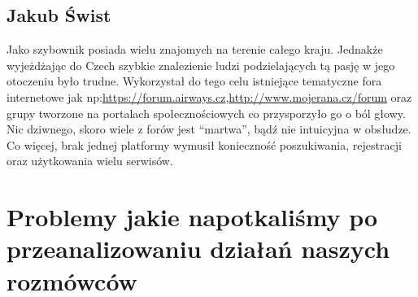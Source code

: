 \documentclass{article}
\begin{document}
\subsection{Jakub Świst}
Jako szybownik posiada wielu znajomych na terenie całego kraju. Jednakże wyjeżdżając do Czech szybkie znalezienie ludzi podzielających tą pasję w jego otoczeniu było trudne. Wykorzystał do tego celu istniejące tematyczne fora internetowe jak np:\url{https://forum.airways.cz},\url{http://www.mojerana.cz/forum} oraz grupy tworzone na portalach społecznościowych co przysporzyło go o ból głowy. Nic dziwnego, skoro wiele z forów jest “martwa”, bądź nie intuicyjna w obsłudze. Co więcej, brak jednej platformy wymusił konieczność poszukiwania, rejestracji oraz użytkowania wielu serwisów.

\section{Problemy jakie napotkaliśmy po przeanalizowaniu działań naszych rozmówców} \newline\newline
\end{document}
